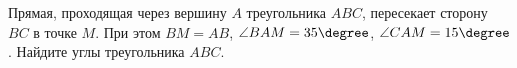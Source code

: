 \begin{ex}
	\begin{condition}
		Прямая, проходящая через вершину \( A  \) треугольника \( ABC \), пересекает сторону \( BC  \) в точке \( M  \). При этом \( BM = AB \), \( \angle BAM = 35\degree \), \( \angle CAM = 15\degree \). Найдите углы треугольника \( ABC \).
	\end{condition}
	\answer{\( 50\degree, 110\degree, 20\degree\)}
\end{ex}